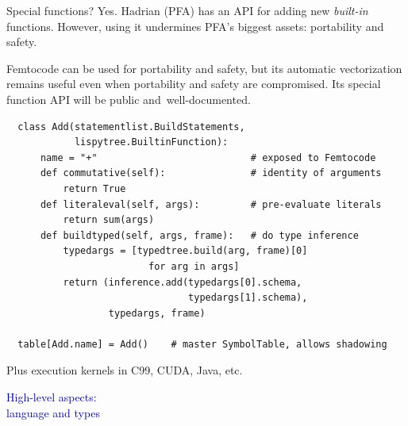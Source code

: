 \documentclass{beamer}
\begin{document}
\begin{frame}[fragile]{Special functions? Yes.}
\small
\vspace{0.25 cm}
Hadrian (PFA) has an API for adding new {\it built-in} functions. However, using it undermines PFA's biggest assets: portability and safety.

\vspace{0.25 cm}
Femtocode can be used for portability and safety, but its automatic vectorization remains useful even when portability and safety are compromised. Its special function API will be public \mbox{and well-documented.\hspace{-1 cm}}

\scriptsize
\begin{verbatim}
  class Add(statementlist.BuildStatements,
            lispytree.BuiltinFunction):
      name = "+"                           # exposed to Femtocode
      def commutative(self):               # identity of arguments
          return True
      def literaleval(self, args):         # pre-evaluate literals
          return sum(args)
      def buildtyped(self, args, frame):   # do type inference
          typedargs = [typedtree.build(arg, frame)[0]
                         for arg in args]
          return (inference.add(typedargs[0].schema,
                                typedargs[1].schema),
                  typedargs, frame)

  table[Add.name] = Add()    # master SymbolTable, allows shadowing
\end{verbatim}

Plus execution kernels in C99, CUDA, Java, etc.
\end{frame}

\begin{frame}{}
\begin{center}
\textcolor{darkblue}{\huge High-level aspects: \\\vspace{0.25 cm} language and types}
\end{center}
\end{frame}
\end{document}
